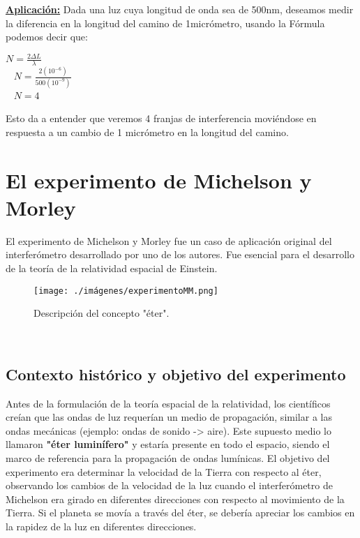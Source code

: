 \documentclass[a4paper, 12pt]{article}
\begin{document}
		\textbf{\underline{Aplicación:}} \newline
		\indent Dada una luz cuya longitud de onda sea de 500nm, deseamos medir la diferencia en la longitud del camino de 1micrómetro, usando la Fórmula podemos decir que:
		\begin{center}
			$N = \frac{2 \Delta L}{\lambda}$  \\ \
			\newline
			$N = \frac{2(10^{-6})}{500(10^{-9})}$  \\ \
			\newline
			$N = 4$ \\
		\end{center}
		Esto da a entender que veremos 4 franjas de interferencia moviéndose en respuesta a un cambio de 1 micrómetro en la longitud del camino.
		
		\section{\textbf{El experimento de Michelson y Morley}}
		
		\indent El experimento de Michelson y Morley fue un caso de aplicación original del interferómetro desarrollado por uno de los autores. Fue esencial para el desarrollo de la teoría de la relatividad espacial de Einstein.
		
		\begin{figure}[h!]
			\centering
			\texttt{[image: ./imágenes/experimentoMM.png]}
			\caption{Descripción del concepto "éter".}
			\label{fig:experimentoMM}
		\end{figure}
		\
		\subsection{Contexto histórico y objetivo del experimento}
		\indent Antes de la formulación de la teoría espacial de la relatividad, los científicos creían que las ondas de luz requerían un medio de propagación, similar a las ondas mecánicas (ejemplo: ondas de sonido -> aire). Este supuesto medio lo llamaron \textbf{"éter luminífero"} y estaría presente en todo el espacio, siendo el marco de referencia para la propagación de ondas lumínicas. \newline
		\indent El objetivo del experimento era determinar la velocidad de la Tierra con respecto al éter, observando los cambios de la velocidad de la luz cuando el interferómetro de Michelson era girado en diferentes direcciones con respecto al movimiento de la Tierra. Si el planeta se movía a través del éter, se debería apreciar los cambios en la rapidez de la luz en diferentes direcciones.
		
\end{document}
